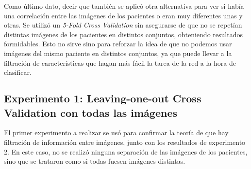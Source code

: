 Como último dato, decir que también se aplicó otra alternativa para ver si había una correlación entre las imágenes de los pacientes o eran muy diferentes unas y otras. Se utilizó un \textit{5-Fold Cross Validation} sin asegurarse de que no se repetían distintas imágenes de los pacientes en distintos conjuntos, obteniendo resultados formidables. Esto no sirve sino para reforzar la idea de que no podemos usar imágenes del mismo paciente en distintos conjuntos, ya que puede llevar a la filtración de características que hagan más fácil la tarea de la red a la hora de clasificar.\\

\subsection{Experimento 1: Leaving-one-out Cross Validation con todas las imágenes}
\label{exp1}
El primer experimento a realizar se usó para confirmar la teoría de que hay filtración de información entre imágenes, junto con los resultados de experimento 2. En este caso, no se realizó ninguna separación de las imágenes de los pacientes, sino que se trataron como si todas fuesen imágenes distintas.\\

